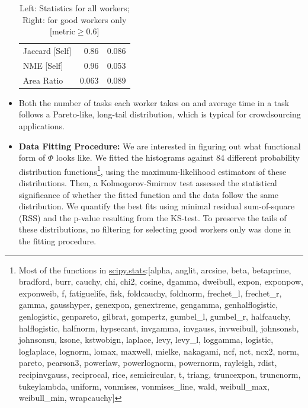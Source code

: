 \documentclass[12pt]{article}
\begin{document}
\begin{itemize}
\begin{table}[h]
\begin{tabular}{lrr}
 Jaccard [Self]   &  0.86  &  0.086 \\
 NME [Self]       &  0.96  &  0.053 \\
 Area Ratio       &  0.063 &  0.089 \\
\hline
\end{tabular}
\caption{Left: Statistics for all workers; Right: for good workers only [metric$\geq$0.6]}
\label{basic_stat}
\end{table}
\item Both the number of tasks each worker takes on and average time in a task follows a Pareto-like, long-tail distribution, which is typical for crowdsourcing applications.
\item \textbf{Data Fitting Procedure:} We are interested in figuring out what functional form of $\Phi$ looks like. We fitted the histograms against 84 different probability distribution functions\footnote{Most of the functions in  \href{https://docs.scipy.org/doc/scipy/reference/stats.html}{scipy.stats}:\tiny{[alpha, anglit, arcsine, beta, betaprime, bradford, burr, cauchy, chi, chi2, cosine, dgamma, dweibull, expon, exponpow, exponweib, f, fatiguelife, fisk, foldcauchy, foldnorm, frechet\_l, frechet\_r, gamma, gausshyper, genexpon, genextreme, gengamma, genhalflogistic, genlogistic, genpareto, gilbrat, gompertz, gumbel\_l, gumbel\_r, halfcauchy, halflogistic, halfnorm, hypsecant, invgamma, invgauss, invweibull, johnsonsb, johnsonsu, ksone, kstwobign, laplace, levy, levy\_l, loggamma, logistic, loglaplace, lognorm, lomax, maxwell, mielke, nakagami, ncf, nct, ncx2, norm, pareto, pearson3, powerlaw, powerlognorm, powernorm, rayleigh, rdist, recipinvgauss, reciprocal, rice, semicircular, t, triang, truncexpon, truncnorm, tukeylambda, uniform, vonmises, vonmises\_line, wald, weibull\_max, weibull\_min, wrapcauchy]}}, using the maximum-likelihood estimators of these distributions. Then, a  Kolmogorov-Smirnov test  assessed the statistical significance of whether the fitted function and the data follow the same distribution. We quantify the best fits using minimal residual sum-of-square (RSS) and the p-value resulting from the KS-test.  To preserve the tails of these distributions, no filtering for selecting good workers only was done in the fitting procedure. 
\end{itemize}
\end{document}
